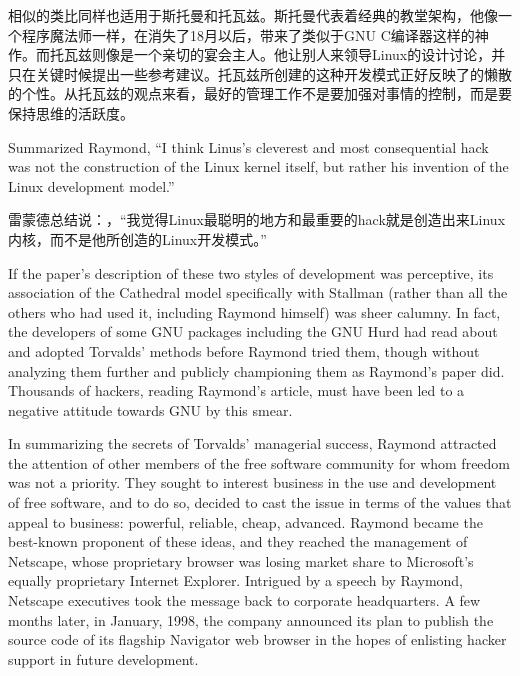 \ifdefined\chs
相似的类比同样也适用于斯托曼和托瓦兹。斯托曼代表着经典的教堂架构，他像一个程序魔法师一样，在消失了18月以后，带来了类似于GNU C编译器这样的神作。而托瓦兹则像是一个亲切的宴会主人。他让别人来领导Linux的设计讨论，并只在关键时候提出一些参考建议。托瓦兹所创建的这种开发模式正好反映了的懒散的个性。从托瓦兹的观点来看，最好的管理工作不是要加强对事情的控制，而是要保持思维的活跃度。
\fi

\ifdefined\eng
Summarized Raymond, ``I think Linus's cleverest and most consequential hack was not the construction of the Linux kernel itself, but rather his invention of the Linux development model.''
\fi

\ifdefined\chs
雷蒙德总结说：，``我觉得Linux最聪明的地方和最重要的hack就是创造出来Linux内核，而不是他所创造的Linux开发模式。''
\fi

\ifdefined\eng
If the paper's description of these two styles of development was perceptive, its association of the Cathedral model specifically with Stallman (rather than all the others who had used it, including Raymond himself) was sheer calumny.  In fact, the developers of some GNU packages including the GNU Hurd had read about and adopted Torvalds' methods before Raymond tried them, though without analyzing them further and publicly championing them as Raymond's paper did. Thousands of hackers, reading Raymond's article, must have been led to a negative attitude towards GNU by this smear.
\fi

\ifdefined\chs

\fi

\ifdefined\eng
In summarizing the secrets of Torvalds' managerial success, Raymond attracted the attention of other members of the free software community for whom freedom was not a priority.  They sought to interest business in the use and development of free software, and to do so, decided to cast the issue in terms of the values that appeal to business: powerful, reliable, cheap, advanced.  Raymond became the best-known proponent of these ideas, and they reached the management of Netscape, whose proprietary browser was losing market share to Microsoft's equally proprietary Internet Explorer.  Intrigued by a speech by Raymond, Netscape executives took the message back to corporate headquarters. A few months later, in January, 1998, the company announced its plan to publish the source code of its flagship Navigator web browser in the hopes of enlisting hacker support in future development.
\fi

